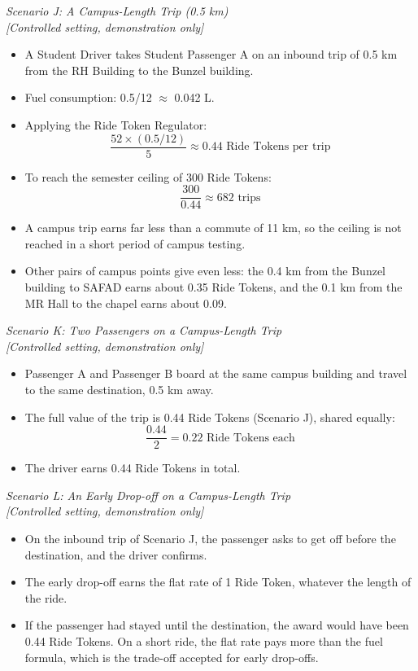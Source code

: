 \vspace{1em}
\noindent\textit{Scenario J: A Campus-Length Trip (0.5 km)}\\\textit{[Controlled setting, demonstration only]}
\begin{itemize}
    \item A Student Driver takes Student Passenger A on an inbound trip of 0.5 km from the RH Building to the Bunzel building.
    \item Fuel consumption: 0.5/12 $\approx$ 0.042 L.
    \item Applying the Ride Token Regulator:
    \[
    \frac{52 \times (0.5/12)}{5} \approx 0.44 \text{ Ride Tokens per trip}
    \]
    \item To reach the semester ceiling of 300 Ride Tokens:
    \[
    \frac{300}{0.44} \approx 682 \text{ trips}
    \]
    \item A campus trip earns far less than a commute of 11 km, so the ceiling is not reached in a short period of campus testing.
    \item Other pairs of campus points give even less: the 0.4 km from the Bunzel building to SAFAD earns about 0.35 Ride Tokens, and the 0.1 km from the MR Hall to the chapel earns about 0.09.
\end{itemize}

\vspace{1em}
\noindent\textit{Scenario K: Two Passengers on a Campus-Length Trip}\\\textit{[Controlled setting, demonstration only]}
\begin{itemize}
    \item Passenger A and Passenger B board at the same campus building and travel to the same destination, 0.5 km away.
    \item The full value of the trip is 0.44 Ride Tokens (Scenario J), shared equally:
    \[
    \frac{0.44}{2} = 0.22 \text{ Ride Tokens each}
    \]
    \item The driver earns 0.44 Ride Tokens in total.
\end{itemize}

\vspace{1em}
\noindent\textit{Scenario L: An Early Drop-off on a Campus-Length Trip}\\\textit{[Controlled setting, demonstration only]}
\begin{itemize}
    \item On the inbound trip of Scenario J, the passenger asks to get off before the destination, and the driver confirms.
    \item The early drop-off earns the flat rate of 1 Ride Token, whatever the length of the ride.
    \item If the passenger had stayed until the destination, the award would have been 0.44 Ride Tokens. On a short ride, the flat rate pays more than the fuel formula, which is the trade-off accepted for early drop-offs.
\end{itemize}

